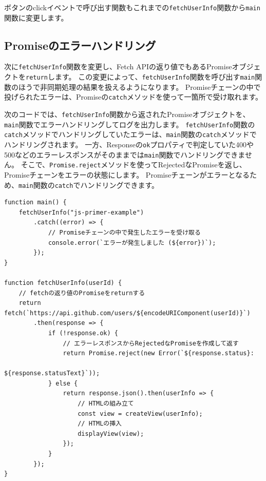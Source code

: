 ボタンのclickイベントで呼び出す関数もこれまでの\texttt{fetchUserInfo}関数から\texttt{main}関数に変更します。



\hypertarget{error-handling}{%
\subsection{Promiseのエラーハンドリング}\label{error-handling}}

次に\texttt{fetchUserInfo}関数を変更し、Fetch
APIの返り値でもあるPromiseオブジェクトを\texttt{return}します。
この変更によって、\texttt{fetchUserInfo}関数を呼び出す\texttt{main}関数のほうで非同期処理の結果を扱えるようになります。
Promiseチェーンの中で投げられたエラーは、Promiseの\texttt{catch}メソッドを使って一箇所で受け取れます。

次のコードでは、\texttt{fetchUserInfo}関数から返されたPromiseオブジェクトを、\texttt{main}関数でエラーハンドリングしてログを出力します。
\texttt{fetchUserInfo}関数の\texttt{catch}メソッドでハンドリングしていたエラーは、\texttt{main}関数の\texttt{catch}メソッドでハンドリングされます。
一方、Responseの\texttt{ok}プロパティで判定していた400や500などのエラーレスポンスがそのままでは\texttt{main}関数でハンドリングできません。
そこで、\texttt{Promise.reject}メソッドを使ってRejectedなPromiseを返し、Promiseチェーンをエラーの状態にします。
Promiseチェーンがエラーとなるため、\texttt{main}関数の\texttt{catch}でハンドリングできます。

\begin{lstlisting}
function main() {
    fetchUserInfo("js-primer-example")
        .catch((error) => {
            // Promiseチェーンの中で発生したエラーを受け取る
            console.error(`エラーが発生しました (${error})`);
        });
}

function fetchUserInfo(userId) {
    // fetchの返り値のPromiseをreturnする
    return fetch(`https://api.github.com/users/${encodeURIComponent(userId)}`)
        .then(response => {
            if (!response.ok) {
                // エラーレスポンスからRejectedなPromiseを作成して返す
                return Promise.reject(new Error(`${response.status}: 
                                                 ${response.statusText}`));
            } else {
                return response.json().then(userInfo => {
                    // HTMLの組み立て
                    const view = createView(userInfo);
                    // HTMLの挿入
                    displayView(view);
                });
            }
        });
}
\end{lstlisting}

